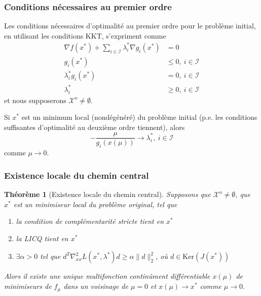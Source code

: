 \documentclass[usepdftitle=false]{beamer}
\newtheorem{thm}{Théorème}
\def\cI{\mathcal{I}}
\def\cX{\mathcal{X}}
\begin{document}
\begin{frame}
\frametitle{Conditions nécessaires au premier ordre}

Les conditions nécessaires d'optimalité au premier ordre pour le problème initial, en utilisant les conditions KKT, s'expriment comme
\begin{align*}
\nabla f(x^*) + \sum_{i \in \cI} \lambda_i^* \nabla g_i(x^*) &= 0 \\
g_i(x^*) &\leq 0,\ i \in \cI \\
\lambda_i^* g_i(x^*) &= 0,\ i \in \cI \\
\lambda_i^* &\geq 0,\ i \in \cI
\end{align*}
et nous supposerons $\cX^o \ne \emptyset$.

\mbox{}

Si $x^*$ est un minimum local (nondégénéré) du problème initial (p.e. les conditions suffisantes d'optimalité au deuxième ordre tiennent), alors
$$
-\frac{\mu}{g_i(x(\mu))} \rightarrow \lambda_i^*,\ i \in \cI
$$
comme $\mu \rightarrow 0$.

\end{frame}

\begin{frame}
\frametitle{Existence locale du chemin central}

\begin{thm}[Existence locale du chemin central]
Supposons que $\cX^o \ne \emptyset$, que $x^*$ est un minimiseur local du problème original, tel que
\begin{enumerate}
\item
la condition de complémentarité stricte tient en $x^*$
\item
la LICQ tient en $x^*$
\item
$\exists \alpha > 0$ tel que $d^T \nabla_{xx}^2 L(x^*, \lambda^*) d \geq \alpha \| d \|_2^2$, où $d \in \mbox{Ker}(J(x^*))$
\end{enumerate}
Alors il existe une unique multifonction continûment différentiable $x(\mu)$ de minimiseurs de $f_{\mu}$ dans un voisinage de $\mu = 0$ et $x(\mu) \rightarrow x^*$ comme $\mu \rightarrow 0$.
\end{thm}

\end{frame}
\end{document}
